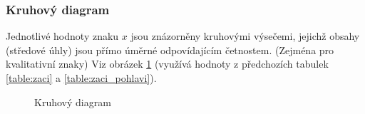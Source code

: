 \documentclass[12pt]{article}
\begin{document}
\subsubsection{Kruhový diagram}
Jednotlivé hodnoty znaku $x$ jsou znázorněny kruhovými výsečemi, jejichž obsahy (středové úhly) jsou přímo úměrné odpovídajícím četnostem. (Zejména pro kvalitativní znaky) Viz obrázek \ref{fig:pie_diagram} (využívá hodnoty z předchozích tabulek \ref{table:zaci} a \ref{table:zaci_pohlavi}).
\begin{figure}[h!]
\caption{Kruhový diagram}
\label{fig:pie_diagram}
\end{figure}
\end{document}
